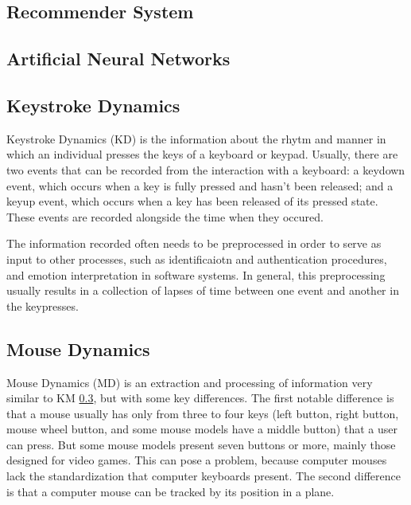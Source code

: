 \documentclass{acm_proc_article-sp}
\begin{document}

\subsection{Recommender System}

\subsection{Artificial Neural Networks}
\label{ANN}

\subsection{Keystroke Dynamics}
\label{KD}

Keystroke Dynamics (KD) is the information about the rhytm and manner
in which an individual presses the keys of a keyboard or
keypad. Usually, there are two events that can be recorded from the
interaction with a keyboard: a keydown event, which occurs when a key
is fully pressed and hasn't been released; and a keyup event, which
occurs when a key has been released of its pressed state. These events
are recorded alongside the time when they occured.

The information recorded often needs to be preprocessed in order to
serve as input to other processes, such as identificaiotn and
authentication procedures, and emotion interpretation in software
systems. In general, this preprocessing usually results in a
collection of lapses of time between one event and another in the
keypresses.


\subsection{Mouse Dynamics}

Mouse Dynamics (MD) is an extraction and processing of information
very similar to KM \ref{KD}, but with some key differences. The first
notable difference is that a mouse usually has only from three to four
keys (left button, right button, mouse wheel button, and some mouse
models have a middle button) that a user can press. But some mouse
models present seven buttons or more, mainly those designed for video
games. This can pose a problem, because computer mouses lack the
standardization that computer keyboards present. The second difference 
is that a computer mouse can be tracked by its position in a plane.
\end{document}
